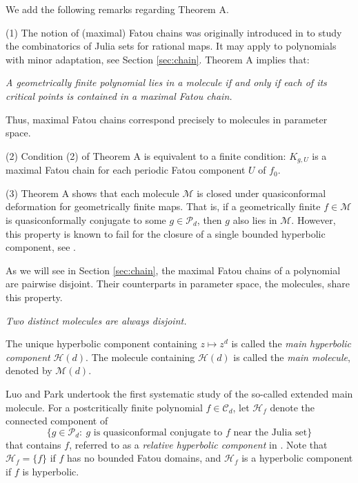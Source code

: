 \documentclass[a4paper,reqno,times, 11pt]{amsart}
\theoremstyle{remark}
\theoremstyle{plain}
\numberwithin{equation}{section}
\def\MMMM{{\cal M}}
\def\MMMM{\mathscr M}
\def\HHHH{\mathscr H}
\def\CCCC{\mathscr C}
\def\PPPP{\mathscr P}
\def\cal{\mathcal}
\begin{document}
	
	 We add the following remarks regarding Theorem A.\vspace{3pt}
	
	
	(1) The notion of (maximal) Fatou chains was originally introduced in \cite{CGZ,DHS} to study the combinatorics of Julia sets  for rational maps. It may apply to polynomials with minor adaptation, see Section \ref{sec:chain}. Theorem A implies that:\vspace{2pt}
	
	\emph{A geometrically finite polynomial lies in a molecule if and only if each of its critical points is contained in a maximal Fatou chain.}\vspace{2pt}
	
	Thus, maximal Fatou chains correspond precisely to molecules in parameter space.\vspace{3pt}
	
	(2) Condition (2) of Theorem A is equivalent to a finite condition:  $K_{g,U}$ is a maximal Fatou chain for each periodic Fatou component $U$ of $f_0$.\vspace{3pt}
	
	(3) Theorem A shows that each molecule $\MMMM$ is closed under quasiconformal deformation for geometrically finite maps. That is, if a geometrically finite $f\in\MMMM$ is quasiconformally conjugate to some $g\in\PPPP_d$, then $g$ also lies in $\MMMM$. However, this property is known to fail for the closure of a single bounded hyperbolic component, see \cite{Tan}.
	\vspace{3pt}
	
	As we will see in Section \ref{sec:chain}, the maximal Fatou chains of a polynomial are pairwise disjoint. Their counterparts in parameter space, the molecules, share this property.\vspace{8pt}
	
	\emph{Two distinct molecules are always disjoint.
	}\vspace{8pt}
	
	The unique hyperbolic component containing $z \mapsto z^d$ is called the \emph{main hyperbolic component} $\HHHH(d)$. The molecule containing $\HHHH(d)$ is called the \emph{main molecule}, denoted by $\MMMM(d)$.
	
	Luo and Park \cite{LP}  undertook the first systematic study of the so-called extended main molecule.
	For a postcritically finite polynomial $f\in\CCCC_d$, let $\HHHH_f$ denote the connected component  of
	\begin{equation}\label{eq:111}
		\{g\in \PPPP_d:\ g\text{ is quasiconformal conjugate to }f\text{ near the Julia set}\}
	\end{equation}
	that contains $f$, referred to as a \emph{relative hyperbolic component} in \cite{LP}. Note that $\HHHH_f=\{f\}$ if $f$ has no bounded Fatou domains, and $\HHHH_f$ is a hyperbolic component if $f$ is hyperbolic.
\end{document}

